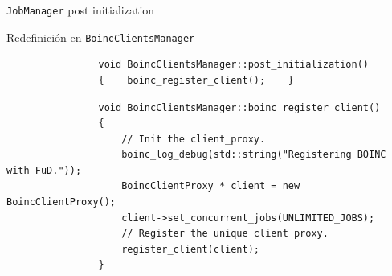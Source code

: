\begin{subsection}{\texttt{JobManager} post initialization}
\begin{frame}[fragile]
		\begin{block}{Redefinición en \texttt{BoincClientsManager}}
			\begin{lstlisting}
				void BoincClientsManager::post_initialization()
				{    boinc_register_client();    }
			\end{lstlisting}
			\begin{lstlisting}
				void BoincClientsManager::boinc_register_client()
				{
				    // Init the client_proxy.
				    boinc_log_debug(std::string("Registering BOINC with FuD."));
				    BoincClientProxy * client = new BoincClientProxy();
				    client->set_concurrent_jobs(UNLIMITED_JOBS);
				    // Register the unique client proxy.
				    register_client(client);
				}
			\end{lstlisting}
		\end{block}
	\end{frame}

\end{subsection}



